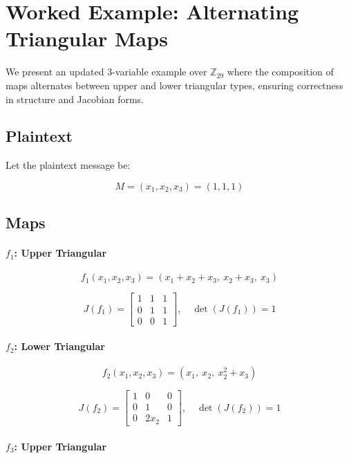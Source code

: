 \documentclass[12pt]{article}
\begin{document}
\section{Worked Example: Alternating Triangular Maps}

We present an updated 3-variable example over \( \mathbb{Z}_{29} \) where the composition of maps alternates between upper and lower triangular types, ensuring correctness in structure and Jacobian forms.

\subsection*{Plaintext}
Let the plaintext message be:

\[
M = (x_1, x_2, x_3) = (1, 1, 1)
\]

\subsection*{Maps}

\paragraph{\( f_1 \): Upper Triangular}

\[
f_1(x_1, x_2, x_3) = (x_1 + x_2 + x_3,\ x_2 + x_3,\ x_3)
\]

\[
J(f_1) =
\begin{bmatrix}
1 & 1 & 1 \\
0 & 1 & 1 \\
0 & 0 & 1
\end{bmatrix}, \quad \det(J(f_1)) = 1
\]

\paragraph{\( f_2 \): Lower Triangular}

\[
f_2(x_1, x_2, x_3) = (x_1,\ x_2,\ x_2^2 + x_3)
\]

\[
J(f_2) =
\begin{bmatrix}
1 & 0 & 0 \\
0 & 1 & 0 \\
0 & 2x_2 & 1
\end{bmatrix}, \quad \det(J(f_2)) = 1
\]

\paragraph{\( f_3 \): Upper Triangular}
\end{document}
